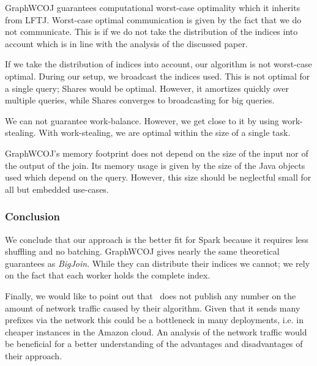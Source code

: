 GraphWCOJ guarantees computational worst-case optimality which it inherits from \textsc{LFTJ}.
Worst-case optimal communication is given by the fact that we do not communicate.
This is if we do not take the distribution of the indices into account which is in line with the analysis of the discussed paper.

If we take the distribution of indices into account, our algorithm is not worst-case optimal.
During our setup, we broadcast the indices used.
This is not optimal for a single query;
Shares would be optimal.
However, it amortizes quickly over multiple queries, while Shares converges to broadcasting for big queries.

We can not guarantee work-balance.
However, we get close to it by using work-stealing.
With work-stealing, we are optimal within the size of a single task.

GraphWCOJ's memory footprint does not depend on the size of the input nor of the output of the join.
Its memory usage is given by the size of the Java objects used which depend on the query.
However, this size should be neglectful small for all but embedded use-cases.

\subsubsection{Conclusion}
We conclude that our approach is the better fit for Spark because it requires less shuffling and no batching.
GraphWCOJ gives nearly the same theoretical guarantees as \textit{BigJoin}.
While they can distribute their indices we cannot;
we rely on the fact that each worker holds the complete index.

Finally, we would like to point out that~\cite{ammar2018distributed} does not publish any number on the amount
of network traffic caused by their algorithm.
Given that it sends many prefixes via the network this could be a bottleneck in many deployments, i.e. in cheaper instances
in the Amazon cloud.
An analysis of the network traffic would be beneficial for a better understanding of the advantages and disadvantages
of their approach.



